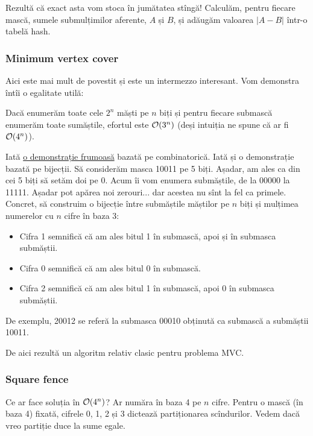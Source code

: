 \documentclass[../main.tex]{subfiles}
\begin{document}
Rezultă că exact asta vom stoca în jumătatea stîngă! Calculăm, pentru fiecare mască, sumele submulțimilor aferente, $A$ și $B$, și adăugăm valoarea $|A-B|$ într-o tabelă hash.

\subsubsection*{Minimum vertex cover}

Aici este mai mult de povestit și este un intermezzo interesant. Vom demonstra întîi o egalitate utilă:

Dacă enumerăm toate cele $2^n$ măști pe $n$ biți și pentru fiecare submască enumerăm toate sumăștile, efortul este $\mathcal{O}(3^n)$ (deși intuiția ne spune că ar fi $\mathcal{O}(4^n)$).

Iată \href{https://cp-algorithms.com/algebra/all-submasks.html#iterating-through-all-masks-with-their-submasks-complexity-o3n}{o demonstrație frumoasă} bazată pe combinatorică. Iată și o demonstrație bazată pe bijecții. Să considerăm masca 10011 pe 5 biți. Așadar, am ales ca din cei 5 biți să setăm doi pe 0. Acum îi vom enumera submăștile, de la 00000 la 11111. Așadar pot apărea noi zerouri... dar acestea nu sînt la fel ca primele.  Concret, să construim o bijecție între submăștile măștilor pe $n$ biți și mulțimea numerelor cu $n$ cifre în baza 3:

\begin{itemize}
  \item Cifra 1 semnifică că am ales bitul 1 în submască, apoi și în submasca submăștii.
  \item Cifra 0 semnifică că am ales bitul 0 în submască.
  \item Cifra 2 semnifică că am ales bitul 1 în submască, apoi 0 în submasca submăștii.
\end{itemize}

De exemplu, 20012 se referă la submasca 00010 obținută ca submască a submăștii 10011.

De aici rezultă un algoritm relativ clasic pentru problema MVC.

\subsubsection*{Square fence}

Ce ar face soluția în $\mathcal{O}(4^n)$? Ar număra în baza 4 pe $n$ cifre. Pentru o mască (în baza 4) fixată, cifrele 0, 1, 2 și 3 dictează partiționarea scîndurilor. Vedem dacă vreo partiție duce la sume egale.
\end{document}
